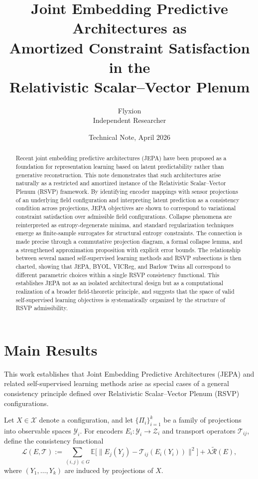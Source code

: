 \documentclass[12pt, oneside]{article}
\title{\textbf{Joint Embedding Predictive Architectures as\\
Amortized Constraint Satisfaction in the\\
Relativistic Scalar--Vector Plenum}}
\author{Flyxion\\
\small Independent Researcher}
\date{\small Technical Note, April 2026}
\begin{document}
\maketitle

\begin{abstract}
Recent joint embedding predictive architectures (JEPA) have been proposed as a foundation for representation learning based on latent predictability rather than generative reconstruction. This note demonstrates that such architectures arise naturally as a restricted and amortized instance of the Relativistic Scalar--Vector Plenum (RSVP) framework. By identifying encoder mappings with sensor projections of an underlying field configuration and interpreting latent prediction as a consistency condition across projections, JEPA objectives are shown to correspond to variational constraint satisfaction over admissible field configurations. Collapse phenomena are reinterpreted as entropy-degenerate minima, and standard regularization techniques emerge as finite-sample surrogates for structural entropy constraints. The connection is made precise through a commutative projection diagram, a formal collapse lemma, and a strengthened approximation proposition with explicit error bounds. The relationship between several named self-supervised learning methods and RSVP subsections is then charted, showing that JEPA, BYOL, VICReg, and Barlow Twins all correspond to different parametric choices within a single RSVP consistency functional. This establishes JEPA not as an isolated architectural design but as a computational realization of a broader field-theoretic principle, and suggests that the space of valid self-supervised learning objectives is systematically organized by the structure of RSVP admissibility.
\end{abstract}

\newpage
\tableofcontents

\bigskip

\section{Main Results}
\label{sec:main-results}

This work establishes that Joint Embedding Predictive Architectures (JEPA) and related self-supervised learning methods arise as special cases of a general consistency principle defined over Relativistic Scalar--Vector Plenum (RSVP) configurations.

Let $X \in \mathcal{X}$ denote a configuration, and let $\{\Pi_i\}_{i=1}^k$ be a family of projections into observable spaces $\mathcal{Y}_i$. For encoders $E_i : \mathcal{Y}_i \to \mathcal{Z}_i$ and transport operators $\mathcal{T}_{ij}$, define the consistency functional
\[
\mathcal{L}(E,\mathcal{T}) :=
\sum_{(i,j)\in G}
\mathbb{E}\big[
\|E_j(Y_j) - \mathcal{T}_{ij}(E_i(Y_i))\|^2
\big]
+ \lambda \widetilde{\mathcal{R}}(E),
\]
where $(Y_1,\dots,Y_k)$ are induced by projections of $X$.
\end{document}
